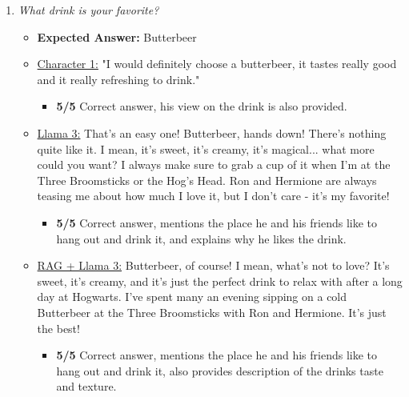 \documentclass[fleqn,moreauthors,10pt]{ds_report}
\begin{document}
\begin{appendices}
\begin{enumerate}
            \item \textit{What drink is your favorite?}
            \begin{itemize}
                \item \textbf{Expected Answer:} Butterbeer
                \item \underline{Character 1:} "I would definitely choose a butterbeer, it tastes really good and it really refreshing to drink."
                \begin{itemize}
                    \item \textbf{5/5} Correct answer, his view on the drink is also provided.
                \end{itemize}
                \item \underline{Llama 3:} That's an easy one! Butterbeer, hands down! There's nothing quite like it. I mean, it's sweet, it's creamy, it's magical... what more could you want? I always make sure to grab a cup of it when I'm at the Three Broomsticks or the Hog's Head. Ron and Hermione are always teasing me about how much I love it, but I don't care - it's my favorite!
                \begin{itemize}
                    \item \textbf{5/5} Correct answer, mentions the place he and his friends like to hang out and drink it, and explains why he likes the drink.
                \end{itemize}
                \item \underline{RAG + Llama 3:} Butterbeer, of course! I mean, what's not to love? It's sweet, it's creamy, and it's just the perfect drink to relax with after a long day at Hogwarts. I've spent many an evening sipping on a cold Butterbeer at the Three Broomsticks with Ron and Hermione. It's just the best!
                \begin{itemize}
                    \item \textbf{5/5} Correct answer, mentions the place he and his friends like to hang out and drink it, also provides description of the drinks taste and texture.
                \end{itemize}
            \end{itemize}
        

\end{enumerate}
\end{appendices}
\end{document}
